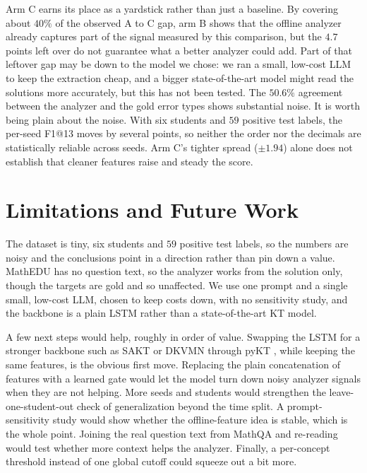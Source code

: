 \documentclass[11pt]{article}
\begin{document}
Arm C earns its place as a yardstick rather than just a baseline. By covering about
$40\%$ of the observed A to C gap, arm B shows that the offline analyzer already captures part of
the signal measured by this comparison, but the $4.7$ points left over do not guarantee what a
better analyzer could add. Part of that leftover gap may be down to the model we
chose: we ran a small, low-cost LLM to keep the extraction cheap, and a bigger
state-of-the-art model might read the solutions more accurately, but this has not been tested. The $50.6\%$ agreement between the analyzer and the gold error
types shows substantial noise. It is worth being plain about the noise. With six students
and $59$ positive test labels, the per-seed F1@13 moves by several points, so neither the order
nor the decimals are statistically reliable across seeds. Arm C's tighter spread ($\pm1.94$) alone does not establish that cleaner features raise and steady the score.

\section{Limitations and Future Work}
The dataset is tiny, six students and $59$ positive test labels, so the numbers are
noisy and the conclusions point in a direction rather than pin down a value. MathEDU has
no question text, so the analyzer works from the solution only, though the targets are
gold and so unaffected. We use one prompt and a single small, low-cost LLM, chosen to keep costs down, with no
sensitivity study, and the backbone is a plain LSTM rather than a state-of-the-art KT
model.

A few next steps would help, roughly in order of value. Swapping the LSTM for a stronger
backbone such as SAKT or DKVMN through pyKT \cite{liu2022pykt}, while keeping
the same features, is the obvious first move. Replacing the plain concatenation of
features with a learned gate would let the model turn down noisy analyzer signals when
they are not helping. More seeds and students would strengthen the leave-one-student-out check of
generalization beyond the time split. A prompt-sensitivity study
would show whether the offline-feature idea is stable, which is the whole point. Joining
the real question text from MathQA and re-reading would test whether more context helps
the analyzer. Finally, a per-concept threshold instead of one global cutoff could squeeze
out a bit more.
\end{document}
